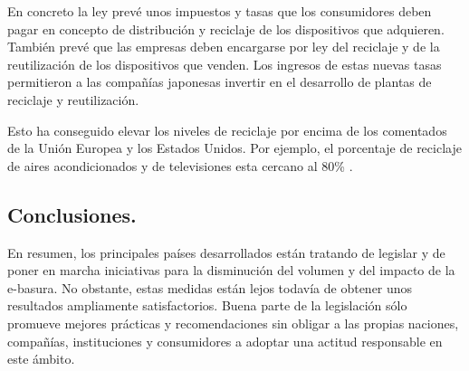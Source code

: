 En concreto la ley prevé unos impuestos y tasas que los consumidores deben pagar en concepto de distribución y reciclaje de los dispositivos que adquieren. También prevé que las empresas deben encargarse por ley del reciclaje y de la reutilización de los dispositivos que venden. Los ingresos de estas nuevas tasas permitieron a las compañías japonesas invertir en el desarrollo de plantas de reciclaje y reutilización. 

Esto ha conseguido elevar los niveles de reciclaje por encima de los comentados de la Unión Europea y los Estados Unidos. Por ejemplo, el porcentaje de reciclaje de aires acondicionados y de televisiones esta cercano al 80\% \cite{japan-report}.

\subsection{Conclusiones.}

En resumen, los principales países desarrollados están tratando de legislar y de poner en marcha iniciativas para la disminución del volumen y del impacto de la e-basura. No obstante, estas medidas están lejos todavía de obtener unos resultados ampliamente satisfactorios. Buena parte de la legislación sólo promueve mejores prácticas y recomendaciones sin obligar a las propias naciones, compañías, instituciones y consumidores a adoptar una actitud responsable en este ámbito.